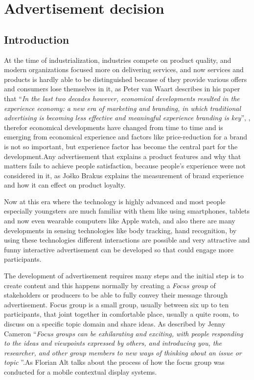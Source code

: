 \chapter{Advertisement decision} %

\label{Chapter4} %
\newpage



\section{Introduction}
At the time of industrialization, industries compete on product quality, and modern organizations focused more on delivering services, and now services and products is hardly able to be distinguished because of they provide various offers and consumers lose themselves in it, as Peter van Waart describes in his paper that ``\emph{In the last two decades however, economical developments resulted in the experience economy: a new era of marketing and branding, in which traditional advertising is becoming less effective and meaningful experience branding is key}'', \cite{Meaningful_ad}, therefor economical developments have changed from time to time and is emerging from economical experience and factors like price-reduction for a brand is not so important, but experience factor has become the central part for the development.Any advertisement that explains a product features and why that matters fails to achieve people satisfaction, because people’s experience were not considered in it, as Joško Brakus \cite{Brand_experience} explains the measurement of brand experience and how it can effect on product loyalty.

Now at this era where the technology is highly advanced and most people especially youngsters are much familiar with them like using smartphones, tablets and now even wearable computers like Apple watch, and also there are many developments in sensing technologies like body tracking, hand recognition, by using these technologies different interactions are possible and very attractive and funny interactive advertisement can be developed so that could engage more participants.

The development of advertisement requires many steps and the initial step is to create content and this happens normally by creating a \emph{Focus group} of stakeholders or producers to be able to fully convey their message through advertisement. Focus group is a small group, usually between six up to ten participants, that joint together in comfortable place, usually a quite room, to discuss on a specific topic domain and share ideas. As described by Jenny Cameron ``\emph{Focus groups can be exhilarating and exciting, with people responding to the ideas and viewpoints expressed by others, and introducing you, the researcher, and other group members to new ways of thinking about an issue or topic }''\cite{FocusGroup}.As Florian Alt \cite{mobile_focus_group} talks about the process of how the focus group was conducted for a mobile contextual display systems.

